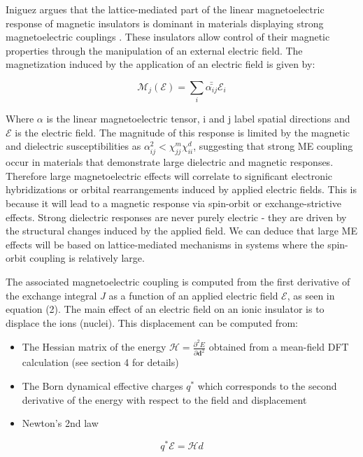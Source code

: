 \documentclass[10pt]{article}
\begin{document}
Iniguez argues that the lattice-mediated part of the linear magnetoelectric response of magnetic insulators is dominant in materials displaying strong magnetoelectric couplings \cite{iniguez2008first}. These insulators allow control of their magnetic properties through the manipulation of an external electric field. The magnetization induced by the application of an electric field is given by:

\begin{equation*}
\mathcal{M}_j(\mathcal{E}) = \sum_i \bar{\bar{\alpha_{ij}}}\mathcal{E}_i
\end{equation*}

Where $\alpha$ is the linear magnetoelectric tensor, i and j label spatial directions and $\mathcal{E}$ is the electric field. The magnitude of this response is limited by the magnetic and dielectric susceptibilities as $\alpha^2_{ij} < \chi^m_{jj}\chi^d_{ii}$, suggesting that strong ME coupling occur in materials that demonstrate large dielectric and magnetic responses. Therefore large magnetoelectric effects will correlate to significant electronic hybridizations or orbital rearrangements induced by applied electric fields. This is because it will lead to a magnetic response via spin-orbit or exchange-strictive effects. Strong dielectric responses are never purely electric - they are driven by the structural changes induced by the applied field. We can deduce that large ME effects will be based on lattice-mediated mechanisms in systems where the spin-orbit coupling is relatively large. 

The associated magnetoelectric coupling is computed from the first derivative of the exchange integral $J$ as a function of an applied electric field $\mathcal{E}$, as seen in equation (2). The main effect of an electric field on an ionic insulator is to displace the ions (nuclei). This displacement can be computed from:
\begin{itemize}
	\item The Hessian matrix of the
	energy $\mathcal{H} = \frac{\partial^2 E}{\partial \mathbf{d} ^2} $ obtained
	from a mean-field DFT calculation (see section 4 for details)
	\item The Born dynamical effective charges $q^*$ which corresponds to the second
	derivative of the energy with respect to the field and displacement
	\item Newton's 2nd law
\end{itemize}

\begin{equation}
	q^* \mathcal{E} = \mathcal{H} d
\end{equation}
\end{document}
